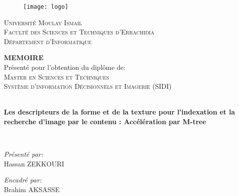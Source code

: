\documentclass[
openany,
11pt, %
french, %
singlespacing, %
headsepline, %
]{MastersDoctoralThesis} %
\begin{document}
\begin{titlepage}
\begin{center}

\begin{figure}[H]
	\centering
	\texttt{[image: logo]}
\end{figure}
{\scshape\LARGE Université Moulay Ismail \\
	Faculté des Sciences et Techniques d’Errachidia\\
	Département d’Informatique \par}\vspace{1.5cm} %

\textbf{MEMOIRE}\\

Présenté pour l’obtention du diplôme de:\\

\textsc{\Large Master en Sciences et Techniques \\ Système d’information Décisionnels et Imagerie (SIDI)}\\[0.5cm] %

\HRule \\[0.4cm] %
{\huge \bfseries Les descripteurs de la forme et de la texture pour l’indexation et la recherche d’image par le contenu : Accélération par M-tree \par}\vspace{0.4cm} %
\HRule \\[1.5cm] %
 
\begin{minipage}[t]{0.4\textwidth}
\begin{flushleft} \large
\emph{Présenté par:}\\
Hassan ZEKKOURI
\end{flushleft}
\end{minipage}
\begin{minipage}[t]{0.4\textwidth}
\begin{flushright} \large
\emph{Encadré par:} \\
 Brahim AKSASSE
 

\end{flushright}
\end{minipage}\\[1cm]


\end{center}
\end{titlepage}
\end{document}
